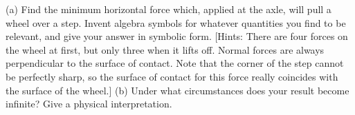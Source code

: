 (a) Find the minimum horizontal force which, applied at
the axle, will pull a wheel over a step. Invent algebra
symbols for whatever quantities you find to be relevant, and
give your answer in symbolic form. [Hints: There are four
forces on the wheel at first, but only three when it lifts
off. Normal forces are always perpendicular to the surface
of contact. Note that the corner of the step cannot be
perfectly sharp, so the surface of contact for this force
really coincides with the surface of the wheel.]\hwendpart
(b) Under what circumstances does your result become
infinite? Give a physical interpretation.
